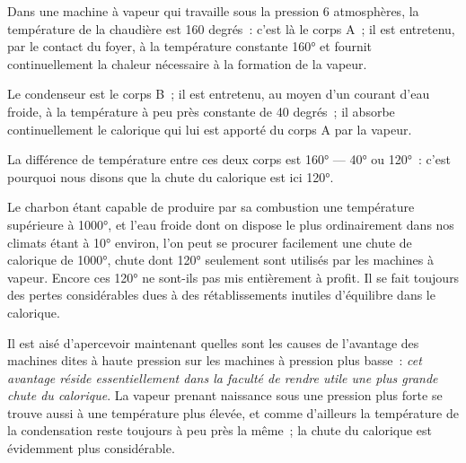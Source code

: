 \documentclass[french,twoside]{book} %
\begin{document}
Dans une machine à vapeur qui travaille sous la pression 6 atmosphères, la température de la chaudière est 160 degrés : c’est là le corps A ; il est entretenu, par le contact du foyer, à la température constante 160° et fournit continuellement la chaleur nécessaire à la formation de la vapeur.\par
Le condenseur est le corps B ; il est entretenu, au moyen d’un courant d’eau froide, à la température à peu près constante de 40 degrés ; il absorbe continuellement le calorique qui lui est apporté du corps A par la vapeur.\par
La différence de température entre ces deux corps est 160° — 40° ou 120° : c’est pourquoi nous disons que la chute du calorique est ici 120°.\par
Le charbon étant capable de produire par sa combustion une température supérieure à 1000°, et l’eau froide dont on dispose le plus ordinairement dans nos climats étant à 10° environ, l’on peut se procurer facilement une chute de calorique de 1000°, chute dont 120° seulement sont utilisés par les machines à vapeur. Encore ces 120° ne sont-ils pas mis entièrement à profit. Il se fait toujours des pertes considérables dues à des rétablissements inutiles d’équilibre dans le calorique.\par
Il est aisé d’apercevoir maintenant quelles sont les causes de l’avantage des machines dites à haute pression sur les machines à pression plus basse : \emph{cet avantage réside essentiellement dans la faculté de rendre utile une plus grande chute du calorique}. La vapeur prenant naissance sous une pression plus forte se trouve aussi à une température plus élevée, et comme d’ailleurs la température de la condensation reste toujours à peu près la même ; la chute du calorique est évidemment plus considérable.\par
\end{document}

